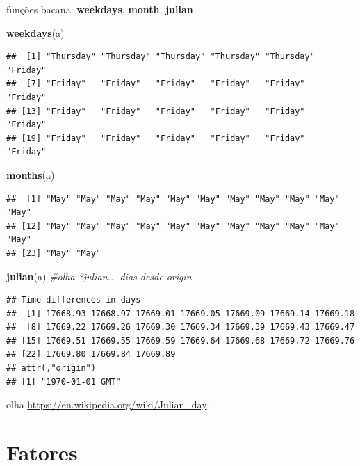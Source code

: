 \documentclass[]{book}
\newenvironment{Shaded}{\begin{snugshade}}{\end{snugshade}}
\newcommand{\KeywordTok}[1]{\textcolor[rgb]{0.13,0.29,0.53}{\textbf{#1}}}
\newcommand{\CommentTok}[1]{\textcolor[rgb]{0.56,0.35,0.01}{\textit{#1}}}
\newcommand{\NormalTok}[1]{#1}
\begin{document}
funções bacana: \textbf{weekdays}, \textbf{month}, \textbf{julian}

\begin{Shaded}
\begin{Highlighting}[]
\KeywordTok{weekdays}\NormalTok{(a)}
\end{Highlighting}
\end{Shaded}

\begin{verbatim}
##  [1] "Thursday" "Thursday" "Thursday" "Thursday" "Thursday" "Friday"  
##  [7] "Friday"   "Friday"   "Friday"   "Friday"   "Friday"   "Friday"  
## [13] "Friday"   "Friday"   "Friday"   "Friday"   "Friday"   "Friday"  
## [19] "Friday"   "Friday"   "Friday"   "Friday"   "Friday"   "Friday"
\end{verbatim}

\begin{Shaded}
\begin{Highlighting}[]
\KeywordTok{months}\NormalTok{(a)}
\end{Highlighting}
\end{Shaded}

\begin{verbatim}
##  [1] "May" "May" "May" "May" "May" "May" "May" "May" "May" "May" "May"
## [12] "May" "May" "May" "May" "May" "May" "May" "May" "May" "May" "May"
## [23] "May" "May"
\end{verbatim}

\begin{Shaded}
\begin{Highlighting}[]
\KeywordTok{julian}\NormalTok{(a) }\CommentTok{#olha ?julian... dias desde origin}
\end{Highlighting}
\end{Shaded}

\begin{verbatim}
## Time differences in days
##  [1] 17668.93 17668.97 17669.01 17669.05 17669.09 17669.14 17669.18
##  [8] 17669.22 17669.26 17669.30 17669.34 17669.39 17669.43 17669.47
## [15] 17669.51 17669.55 17669.59 17669.64 17669.68 17669.72 17669.76
## [22] 17669.80 17669.84 17669.89
## attr(,"origin")
## [1] "1970-01-01 GMT"
\end{verbatim}

olha \url{https://en.wikipedia.org/wiki/Julian_day}:

\section{Fatores}\label{fatores}
\end{document}
